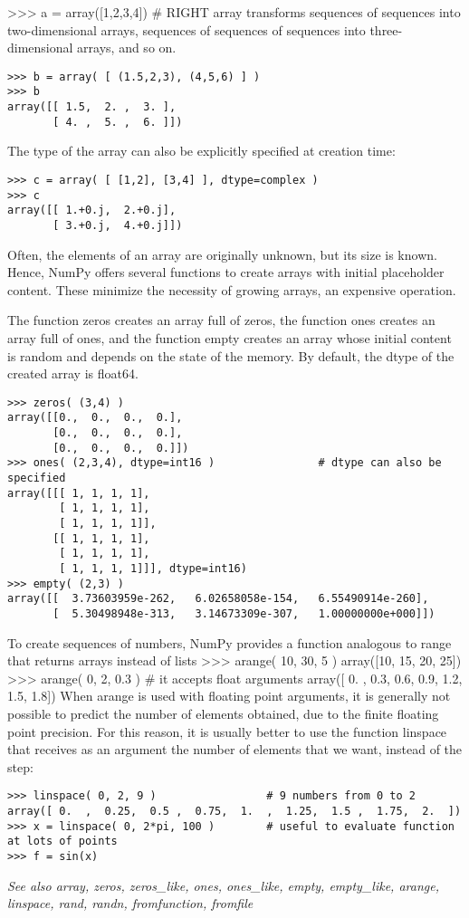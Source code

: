 >>> a = array([1,2,3,4])  # RIGHT
array transforms sequences of sequences into two-dimensional arrays, sequences of sequences of sequences into three-dimensional arrays, and so on.
\begin{verbatim}
>>> b = array( [ (1.5,2,3), (4,5,6) ] )
>>> b
array([[ 1.5,  2. ,  3. ],
       [ 4. ,  5. ,  6. ]])
\end{verbatim}
The type of the array can also be explicitly specified at creation time:
\begin{verbatim}
>>> c = array( [ [1,2], [3,4] ], dtype=complex )
>>> c
array([[ 1.+0.j,  2.+0.j],
       [ 3.+0.j,  4.+0.j]])
\end{verbatim}
Often, the elements of an array are originally unknown, but its size is known. Hence, NumPy offers several functions to create arrays with initial placeholder content. These minimize the necessity of growing arrays, an expensive operation.

The function zeros creates an array full of zeros, the function ones creates an array full of ones, and the function empty creates an array whose initial content is random and depends on the state of the memory. By default, the dtype of the created array is float64.
\begin{verbatim}
>>> zeros( (3,4) )
array([[0.,  0.,  0.,  0.],
       [0.,  0.,  0.,  0.],
       [0.,  0.,  0.,  0.]])
>>> ones( (2,3,4), dtype=int16 )                # dtype can also be specified
array([[[ 1, 1, 1, 1],
        [ 1, 1, 1, 1],
        [ 1, 1, 1, 1]],
       [[ 1, 1, 1, 1],
        [ 1, 1, 1, 1],
        [ 1, 1, 1, 1]]], dtype=int16)
>>> empty( (2,3) )
array([[  3.73603959e-262,   6.02658058e-154,   6.55490914e-260],
       [  5.30498948e-313,   3.14673309e-307,   1.00000000e+000]])
\end{verbatim}
To create sequences of numbers, NumPy provides a function analogous to range that returns arrays instead of lists
>>> arange( 10, 30, 5 )
array([10, 15, 20, 25])
>>> arange( 0, 2, 0.3 )                 # it accepts float arguments
array([ 0. ,  0.3,  0.6,  0.9,  1.2,  1.5,  1.8])
When arange is used with floating point arguments, it is generally not possible to predict the number of elements obtained, due to the finite floating point precision. For this reason, it is usually better to use the function linspace that receives as an argument the number of elements that we want, instead of the step:

\begin{verbatim}
>>> linspace( 0, 2, 9 )                 # 9 numbers from 0 to 2
array([ 0.  ,  0.25,  0.5 ,  0.75,  1.  ,  1.25,  1.5 ,  1.75,  2.  ])
>>> x = linspace( 0, 2*pi, 100 )        # useful to evaluate function at lots of points
>>> f = sin(x)
\end{verbatim}
\textit{See also
array, zeros, zeros_like, ones, ones_like, empty, empty_like, arange, linspace, rand, randn, fromfunction, fromfile}
\newpage

